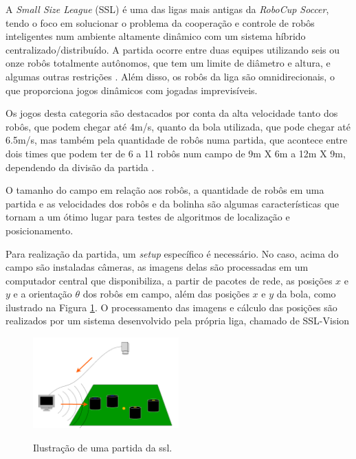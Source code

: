\documentclass[acronym, symbols, table, deposito]{fei}
\begin{document}
		A \textit{Small Size League} (SSL) é uma das ligas mais antigas da \textit{RoboCup Soccer}, tendo o foco em solucionar o problema da cooperação e controle de robôs inteligentes num ambiente altamente dinâmico com um sistema híbrido centralizado/distribuído. A partida ocorre entre duas equipes utilizando seis ou onze robôs totalmente autônomos, que tem um limite de diâmetro e altura, e algumas outras restrições \cite{RoboCup}. Além disso, os robôs da liga são omnidirecionais, o que proporciona jogos dinâmicos com jogadas imprevisíveis.
		
		Os jogos desta categoria são destacados por conta da alta velocidade tanto dos robôs, que podem chegar até 4m/s, quanto da bola utilizada, que pode chegar até 6.5m/s, mas também pela quantidade de robôs numa partida, que acontece entre dois times que podem ter de 6 a 11 robôs num campo de 9m X 6m a 12m X 9m, dependendo da divisão da partida \cite{rules}.
		
		O tamanho do campo em relação aos robôs, a quantidade de robôs em uma partida e as velocidades dos robôs e da bolinha são algumas características que tornam a  um ótimo lugar para testes de algoritmos de localização e posicionamento.
		
		Para realização da partida, um \textit{setup} específico é necessário. No caso, acima do campo são instaladas câmeras, as imagens delas são processadas em um computador central que disponibiliza, a partir de pacotes de rede, as posições $x$ e $y$ e a orientação $\theta$ dos robôs em campo, além das posições $x$ e $y$ da bola, como ilustrado na Figura \ref{fig:ilustracao_partida_ssl}. O processamento das imagens e cálculo das posições são realizados por um sistema desenvolvido pela própria liga, chamado de SSL-Vision \cite{10.1007/978-3-642-11876-0_37}
		
		\begin{figure}[!htb]
			\centering
			\caption{Ilustração de uma partida da \acrshort{ssl}.} 
			\includegraphics[width=0.5\textwidth]{funcionamento_ssl.png}
			\label{fig:ilustracao_partida_ssl}
		\end{figure}
		
\end{document}
